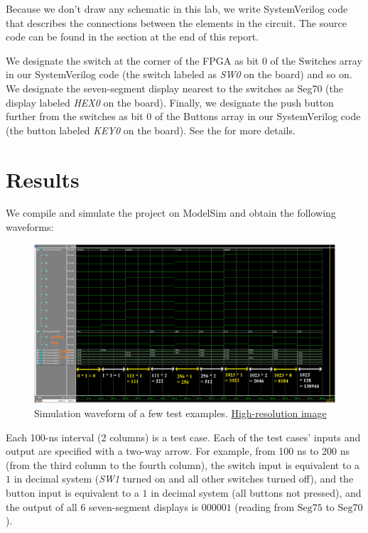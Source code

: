 \documentclass[12pt]{article}
\begin{document}
Because we don't draw any schematic in this lab, we write SystemVerilog code that describes the connections between the elements in the circuit. The source code can be found in the  section at the end of this report.

We designate the switch at the corner of the FPGA as bit $0$ of the Switches array in our SystemVerilog code (the switch labeled as \textit{SW0} on the board) and so on. We designate the seven-segment display nearest to the switches as Seg70 (the display labeled \textit{HEX0} on the board). Finally, we designate the push button further from the switches as bit $0$ of the Buttons array in our SystemVerilog code (the button labeled \textit{KEY0} on the board). See the  for more details.

\section{Results}

We compile and simulate the project on ModelSim and obtain the following waveforms:

\begin{figure}[ht]
  \centering
  \includegraphics[width=\textwidth]{lab4_simulation.png}
  \caption{Simulation waveform of a few test examples. \href{https://i.imgur.com/1UjCN6E.png}{High-resolution image}}
  \label{figure:3}
\end{figure}

\newpage

Each 100-ns interval (2 columns) is a test case. Each of the test cases' inputs and output are specified with a two-way arrow. For example, from 100 ns to 200 ns (from the third column to the fourth column), the switch input is equivalent to a $1$ in decimal system (\textit{SW1} turned on and all other switches turned off), and the button input is equivalent to a $1$ in decimal system (all buttons not pressed), and the output of all 6 seven-segment displays is $000001$ (reading from $\text{Seg75}$ to $\text{Seg70}$).
\end{document}
